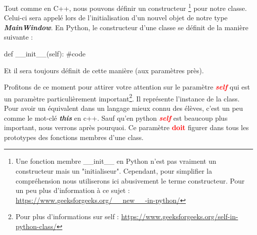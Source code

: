 \documentclass[12pt]{report}    %
\newcommand{\bold}[1]{{\bfseries #1}}
\newcommand{\ib}[1]{{\bfseries\itshape #1}}
\newcommand{\smallSkip}{\vskip 0.5cm}
\begin{document}
Tout comme en C++, nous pouvons définir un constructeur
\footnote
{
Une fonction membre \_\_init\_\_ en Python n'est pas vraiment un constructeur mais un "initialiseur". Cependant, pour simplifier la compréhension nous utiliserons ici abusivement le terme constructeur. Pour un peu plus d'information à ce sujet : \url{https://www.geeksforgeeks.org/__new__-in-python/}
}
pour notre classe. Celui-ci sera appelé lors de l'initialisation d'un nouvel objet de notre type \ib{MainWindow}.\newline
En Python, le constructeur d'une classe se définit de la manière suivante :
\begin{pyCode}
def __init__(self):
    #code
\end{pyCode}
Et il sera toujours définit de cette manière (aux paramètres près).\smallSkip

Profitons de ce moment pour attirer votre attention sur le paramètre \textcolor{red}{\ib{self}} qui est un paramètre particulièrement important\footnote{Pour plus d'informations sur self : \url{https://www.geeksforgeeks.org/self-in-python-class/}}. Il représente l'instance de la class. Pour avoir un équivalent dans un langage mieux connu des élèves, c'est un peu comme le mot-clé \ib{this} en c++. Sauf qu'en python \textcolor{red}{\ib{self}} est beaucoup plus important, nous verrons après pourquoi.\newline
Ce paramètre \textcolor{red}{\bold{doit}} figurer dans tous les prototypes des fonctions membres d'une class.\smallSkip
\end{document}
